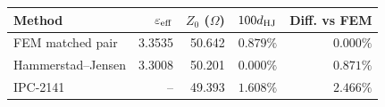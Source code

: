 \begin{tabular}{@{}lrrrr@{}}
\toprule
Method & $\varepsilon_{\rm eff}$ & $Z_0$ ($\Omega$) & $100d_{\rm HJ}$ & Diff. vs FEM\\
\midrule
FEM matched pair & 3.3535 & 50.642 & $0.879\%$ & $0.000\%$\\
Hammerstad--Jensen & 3.3008 & 50.201 & $0.000\%$ & $0.871\%$\\
IPC-2141 & -- & 49.393 & $1.608\%$ & $2.466\%$\\
\bottomrule
\end{tabular}
